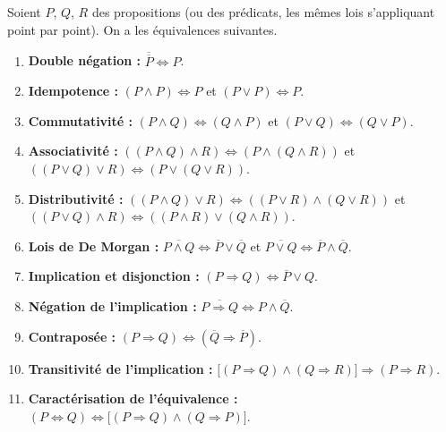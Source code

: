 \documentclass[a4paper,12pt,openany]{book}
\begin{document}
\begin{theoreme}
Soient $P$, $Q$, $R$ des propositions (ou des prédicats, les mêmes lois
s'appliquant point par point). On a les équivalences suivantes.
\begin{enumerate}[label=(\arabic*)]
  \item \textbf{Double négation :} $\overline{\overline{P}} \iff P$.
  \item \textbf{Idempotence :} $(P\wedge P) \iff P$ \quad et \quad
  $(P\vee P) \iff P$.
  \item \textbf{Commutativité :} $(P\wedge Q)\iff(Q\wedge P)$ \quad et \quad
  $(P\vee Q)\iff(Q\vee P)$.
  \item \textbf{Associativité :} $((P\wedge Q)\wedge R)\iff(P\wedge(Q\wedge
  R))$ \quad et \quad $((P\vee Q)\vee R)\iff(P\vee(Q\vee R))$.
  \item \textbf{Distributivité :}
  $((P\wedge Q)\vee R)\iff((P\vee R)\wedge(Q\vee R))$ \quad et \quad
  $((P\vee Q)\wedge R)\iff((P\wedge R)\vee(Q\wedge R))$.
  \item \textbf{Lois de De Morgan :}
  $\overline{P\wedge Q} \iff \overline{P}\vee \overline{Q}$ \quad et \quad
  $\overline{P\vee Q} \iff \overline{P}\wedge \overline{Q}$.
  \item \textbf{Implication et disjonction :}
  $(P\Rightarrow Q) \iff \overline{P}\vee Q$.
  \item \textbf{Négation de l'implication :}
  $\overline{P\Rightarrow Q} \iff P \wedge \overline{Q}$.
  \item \textbf{Contraposée :}
  $(P\Rightarrow Q) \iff (\overline{Q}\Rightarrow \overline{P})$.
  \item \textbf{Transitivité de l'implication :}
  $\big[(P\Rightarrow Q)\wedge (Q\Rightarrow R)\big] \Rightarrow (P\Rightarrow R)$.
  \item \textbf{Caractérisation de l'équivalence :}
  $(P\Leftrightarrow Q) \iff \big[(P\Rightarrow Q)\wedge(Q\Rightarrow P)\big]$.
\end{enumerate}
\end{theoreme}
\end{document}
